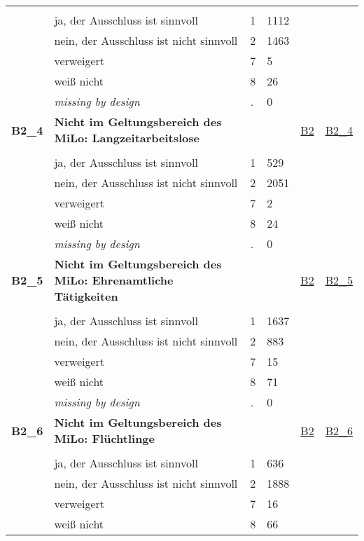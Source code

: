 \begin{longtable}{| L{2.45cm} | L{6cm} | C{1.5cm} | R{1cm} | C{2.25cm} | C{2.25cm} |}
   &  &  &  &  &  \\ 
   & ja, der Ausschluss ist sinnvoll & 1 & 1112 &  &  \\ 
   & nein, der Ausschluss ist nicht sinnvoll & 2 & 1463 &  &  \\ 
   & verweigert & 7 & 5 &  &  \\ 
   & weiß nicht & 8 & 26 &  &  \\ 
   & \textit{missing by design} & \textit{.} & 0 &  &  \\ 
   \midrule
\textbf{B2\_4}\label{var:B2:4} & \textbf{Nicht im Geltungsbereich des MiLo: Langzeitarbeitslose} &  &  & \hyperref[B2]{B2} & \hyperref[var:suf:B2:4]{B2\_4} \\ 
   &  &  &  &  &  \\ 
   & ja, der Ausschluss ist sinnvoll & 1 & 529 &  &  \\ 
   & nein, der Ausschluss ist nicht sinnvoll & 2 & 2051 &  &  \\ 
   & verweigert & 7 & 2 &  &  \\ 
   & weiß nicht & 8 & 24 &  &  \\ 
   & \textit{missing by design} & \textit{.} & 0 &  &  \\ 
   \midrule
\textbf{B2\_5}\label{var:B2:5} & \textbf{Nicht im Geltungsbereich des MiLo: Ehrenamtliche Tätigkeiten} &  &  & \hyperref[B2]{B2} & \hyperref[var:suf:B2:5]{B2\_5} \\ 
   &  &  &  &  &  \\ 
   & ja, der Ausschluss ist sinnvoll & 1 & 1637 &  &  \\ 
   & nein, der Ausschluss ist nicht sinnvoll & 2 & 883 &  &  \\ 
   & verweigert & 7 & 15 &  &  \\ 
   & weiß nicht & 8 & 71 &  &  \\ 
   & \textit{missing by design} & \textit{.} & 0 &  &  \\ 
   \midrule
\textbf{B2\_6}\label{var:B2:6} & \textbf{Nicht im Geltungsbereich des MiLo: Flüchtlinge} &  &  & \hyperref[B2]{B2} & \hyperref[var:suf:B2:6]{B2\_6} \\ 
   &  &  &  &  &  \\ 
   & ja, der Ausschluss ist sinnvoll & 1 & 636 &  &  \\ 
   & nein, der Ausschluss ist nicht sinnvoll & 2 & 1888 &  &  \\ 
   & verweigert & 7 & 16 &  &  \\ 
   & weiß nicht & 8 & 66 &  &  \\ 

\end{longtable}
